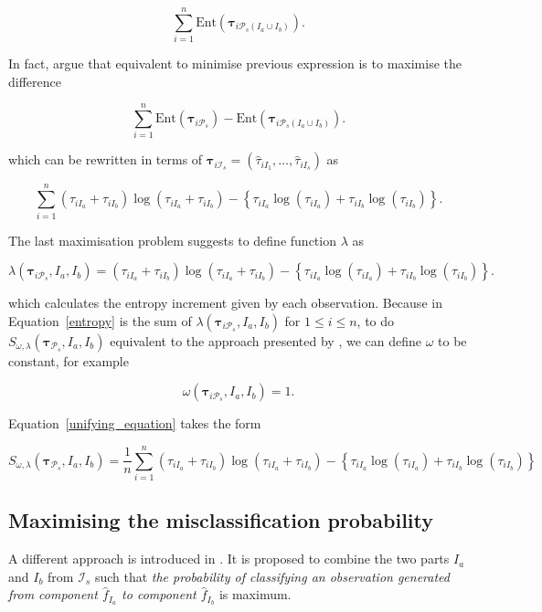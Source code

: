 \documentclass[10pt, a4paper]{article}
\newcommand{\m}[1]{\boldsymbol{#1}}
\begin{document}
\begin{spacing}{1.9}
\[
\sum_{i=1}^n \text{Ent}( \m\tau_{i \mathcal{P}_s(I_a\cup I_b)} ).
\]


In fact, \cite{baudry2010combining}  argue that equivalent to minimise previous expression is to maximise the difference

\[
\sum_{i=1}^n \text{Ent}( \m\tau_{i \mathcal{P}_s} ) - \text{Ent}( \m\tau_{i \mathcal{P}_s(I_a\cup I_b)} ).
\]

which can be rewritten in terms of $\m\tau_{i \mathcal{I}_s} = \left( \hat{\tau}_{i I_1} , \dots, \hat{\tau}_{i I_s}  \right)$ as

\begin{equation}\label{entropy}
\sum_{i=1}^n  (\tau_{iI_a}+\tau_{iI_b}) \log(\tau_{iI_a} + \tau_{iI_b}) - \left\{ \tau_{iI_a} \log(\tau_{iI_a}) + \tau_{iI_b} \log(\tau_{iI_b}) \right\}.
\end{equation}

The last maximisation problem suggests to define function $\lambda$ as

\[
\lambda(\m\tau_{i \mathcal{P}_s},  I_a,  I_b) =  (\tau_{iI_a}+\tau_{iI_b}) \log(\tau_{iI_a} + \tau_{iI_b}) - \left\{ \tau_{iI_a} \log(\tau_{iI_a}) + \tau_{iI_b} \log(\tau_{iI_b}) \right\}.
\]

which calculates the entropy increment given by each observation. Because in Equation~\ref{entropy} is the sum of $\lambda(\m\tau_{i \mathcal{P}_s},  I_a,  I_b)$ for $1 \leq i \leq n$, to do $S_{\omega, \lambda}( \m\tau_{\mathcal{P}_s},  I_a,  I_b) $ equivalent to the approach presented by \cite{baudry2010combining}, we can define $\omega$ to be constant, for example 

\[
\omega(\m\tau_{i \mathcal{P}_s},  I_a,  I_b) = 1.
\]

Equation~\ref{unifying_equation} takes the form

\[
S_{\omega, \lambda}( \m\tau_{\mathcal{P}_s},  I_a,  I_b) = \frac{1}{n} \sum_{i=1}^n (\tau_{iI_a}+\tau_{iI_b}) \log(\tau_{iI_a} + \tau_{iI_b}) - \left\{ \tau_{iI_a} \log(\tau_{iI_a}) + \tau_{iI_b} \log(\tau_{iI_b}) \right\}
\]


\subsection{Maximising the misclassification probability}
\label{missclassification_section}

A different approach is introduced in \cite{hennig2010methods}. It is proposed to combine the two parts $I_a$ and $I_b$ from $ \mathcal{I}_s$ such that \emph{the probability of classifying an observation generated from component $\hat{f}_{I_a}$ to component $\hat{f}_{I_b}$} is maximum.


\end{spacing}
\end{document}
